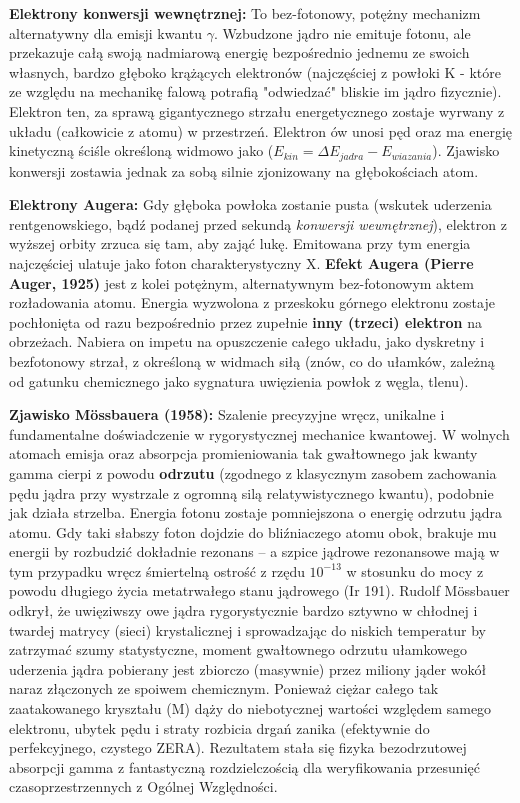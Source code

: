 \documentclass[11pt, a4paper]{article}
\begin{document}
\textbf{Elektrony konwersji wewnętrznej:}
To bez-fotonowy, potężny mechanizm alternatywny dla emisji kwantu $\gamma$. Wzbudzone jądro nie emituje fotonu, ale przekazuje całą swoją nadmiarową energię bezpośrednio jednemu ze swoich własnych, bardzo głęboko krążących elektronów (najczęściej z powłoki K - które ze względu na mechanikę falową potrafią "odwiedzać" bliskie im jądro fizycznie). Elektron ten, za sprawą gigantycznego strzału energetycznego zostaje wyrwany z układu (całkowicie z atomu) w przestrzeń. Elektron ów unosi pęd oraz ma energię kinetyczną ściśle określoną widmowo jako ($E_{kin} = \Delta E_{jadra} - E_{wiazania}$). Zjawisko konwersji zostawia jednak za sobą silnie zjonizowany na głębokościach atom.

\textbf{Elektrony Augera:}
Gdy głęboka powłoka zostanie pusta (wskutek uderzenia rentgenowskiego, bądź podanej przed sekundą \textit{konwersji wewnętrznej}), elektron z wyższej orbity zrzuca się tam, aby zająć lukę. Emitowana przy tym energia najczęściej ulatuje jako foton charakterystyczny X. \textbf{Efekt Augera (Pierre Auger, 1925)} jest z kolei potężnym, alternatywnym bez-fotonowym aktem rozładowania atomu. Energia wyzwolona z przeskoku górnego elektronu zostaje pochłonięta od razu bezpośrednio przez zupełnie \textbf{inny (trzeci) elektron} na obrzeżach. Nabiera on impetu na opuszczenie całego układu, jako dyskretny i bezfotonowy strzał, z określoną w widmach siłą (znów, co do ułamków, zależną od gatunku chemicznego jako sygnatura uwięzienia powłok z węgla, tlenu).

\textbf{Zjawisko Mössbauera (1958):}
Szalenie precyzyjne wręcz, unikalne i fundamentalne doświadczenie w rygorystycznej mechanice kwantowej. W wolnych atomach emisja oraz absorpcja promieniowania tak gwałtownego jak kwanty gamma cierpi z powodu \textbf{odrzutu} (zgodnego z klasycznym zasobem zachowania pędu jądra przy wystrzale z ogromną silą relatywistycznego kwantu), podobnie jak działa strzelba. Energia fotonu zostaje pomniejszona o energię odrzutu jądra atomu. Gdy taki słabszy foton dojdzie do bliźniaczego atomu obok, brakuje mu energii by rozbudzić dokładnie rezonans – a szpice jądrowe rezonansowe mają w tym przypadku wręcz śmiertelną ostrość z rzędu $10^{-13}$ w stosunku do mocy z powodu długiego życia metatrwałego stanu jądrowego (Ir 191).
Rudolf Mössbauer odkrył, że uwięziwszy owe jądra rygorystycznie bardzo sztywno w chłodnej i twardej matrycy (sieci) krystalicznej i sprowadzając do niskich temperatur by zatrzymać szumy statystyczne, moment gwałtownego odrzutu ułamkowego uderzenia jądra pobierany jest zbiorczo (masywnie) przez miliony jąder wokół naraz złączonych ze spoiwem chemicznym. Ponieważ ciężar całego tak zaatakowanego kryształu (M) dąży do niebotycznej wartości względem samego elektronu, ubytek pędu i straty rozbicia drgań zanika (efektywnie do perfekcyjnego, czystego ZERA). Rezultatem stała się fizyka bezodrzutowej absorpcji gamma z fantastyczną rozdzielczością dla weryfikowania przesunięć czasoprzestrzennych z Ogólnej Względności.
\end{document}
